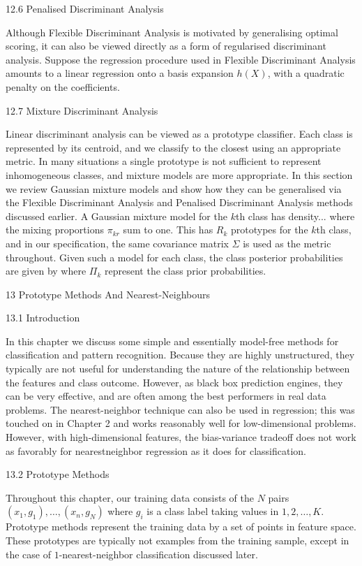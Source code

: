 12.6 Penalised Discriminant Analysis

Although Flexible Discriminant Analysis is motivated by generalising optimal scoring, it can also be viewed directly as a form of regularised discriminant analysis. Suppose the regression procedure used in Flexible Discriminant Analysis amounts to a linear regression onto a basis expansion $h(X)$, with a quadratic penalty on the coefficients.

12.7 Mixture Discriminant Analysis

Linear discriminant analysis can be viewed as a prototype classifier. Each class is represented by its centroid, and we classify to the closest using an appropriate metric. In many situations a single prototype is not sufficient to represent inhomogeneous classes, and mixture models are more appropriate. In this section we review Gaussian mixture models and show how they can be generalised via the Flexible Discriminant Analysis and Penalised Discriminant Analysis methods discussed earlier. A Gaussian mixture model for the $k$th class has density... where the mixing proportions $\pi_{kr}$ sum to one. This has $R_k$ prototypes for the $k$th class, and in our specification, the same covariance matrix $\Sigma$ is used as the metric throughout. Given such a model for each class, the class posterior probabilities are given by where $\Pi_k$ represent the class prior probabilities.

13 Prototype Methods And Nearest-Neighbours

13.1 Introduction

In this chapter we discuss some simple and essentially model-free methods for classification and pattern recognition. Because they are highly unstructured, they typically are not useful for understanding the nature of the relationship between the features and class outcome. However, as black box prediction engines, they can be very effective, and are often among the best performers in real data problems. The nearest-neighbor technique can also be used in regression; this was touched on in Chapter 2 and works reasonably well for low-dimensional problems. However, with high-dimensional features, the bias-variance tradeoff does not work as favorably for nearestneighbor regression as it does for classification.

13.2 Prototype Methods

Throughout this chapter, our training data consists of the $N$ pairs $(x_1,g_1),\dots , (x_n,g_N)$ where $g_i$ is a class label taking values in ${1,2,\dots ,K}$. Prototype methods represent the training data by a set of points in feature space. These prototypes are typically not examples from the training sample, except in the case of $1$-nearest-neighbor classification discussed later.

